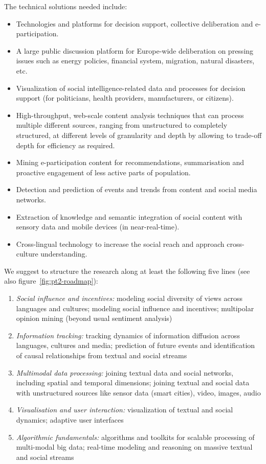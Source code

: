 \documentclass[10pt, plain]{../../metanetpaper}
\begin{document}
\begin{multicols}{2}
The technical solutions needed include:

\begin{itemize}
\item Technologies and platforms for decision support, collective deliberation and e-participation.
\item A large public discussion platform for Europe-wide deliberation on pressing issues such as energy policies, financial system, migration, natural disasters, etc.
\item Visualization of social intelligence-related data and processes for decision support (for politicians, health providers, manufacturers, or citizens).
\item High-throughput, web-scale content analysis techniques that can process multiple different sources, ranging from unstructured to completely structured, at different levels of granularity and depth by allowing to trade-off depth for efficiency as required.
\item Mining e-participation content for recommendations, summarisation and proactive engagement of less active parts of population.
\item Detection and prediction of events and trends from content and social media networks.
\item Extraction of knowledge and semantic integration of social content with sensory data and mobile devices (in near-real-time).
\item Cross-lingual technology to increase the social reach and approach cross-culture understanding.
\end{itemize}

We suggest to structure the research along at least the following five lines (see also figure~\ref{fig:pt2-roadmap}):

\begin{enumerate}
\item \emph{Social influence and incentives:} modeling social diversity of views across languages and cultures; modeling social influence and incentives; multipolar opinion mining (beyond usual sentiment analysis) 
\item \emph{Information tracking:} tracking dynamics of information diffusion across languages, cultures and media; prediction of future events and identification of causal relationships from textual and social streams
\item \emph{Multimodal data processing:} joining textual data and social networks, including spatial and temporal dimensions; joining textual and social data with unstructured sources like sensor data (smart cities), video, images, audio
\item \emph{Visualisation and user interaction:} visualization of textual and social dynamics; adaptive user interfaces
\item \emph{Algorithmic fundamentals:} algorithms and toolkits for scalable processing of multi-modal big data;
real-time modeling and reasoning on massive textual and social streams
\end{enumerate}


\end{multicols}
\end{document}
